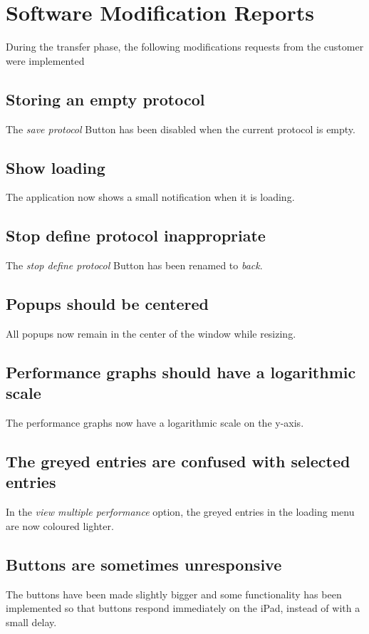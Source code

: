\chapter{Software Modification Reports}
\label{chap:implemented}
During the transfer phase, the following modifications requests from the customer were implemented

\section*{Storing an empty protocol}
The \emph{save protocol} Button has been disabled when the current protocol is empty.

\section*{Show loading}
The application now shows a small notification when it is loading.

\section*{Stop define protocol inappropriate}
The \emph{stop define protocol} Button has been renamed to \emph{back}.

\section*{Popups should be centered}
All popups now remain in the center of the window while resizing.

\section*{Performance graphs should have a logarithmic scale}
The performance graphs now have a logarithmic scale on the y-axis.

\section*{The greyed entries are confused with selected entries}
In the \emph{view multiple performance} option, the greyed entries in the loading menu are now coloured lighter.

\section*{Buttons are sometimes unresponsive}
The buttons have been made slightly bigger and some functionality has been implemented so that buttons respond immediately on the iPad, instead of with a small delay.

